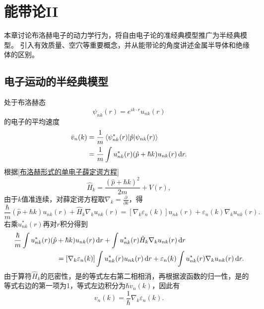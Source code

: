 \chapter{能带论II}
    本章讨论布洛赫电子的动力学行为，将自由电子论的准经典模型推广为半经典模型。
    引入有效质量、空穴等重要概念，并从能带论的角度讲述金属半导体和绝缘体的区别。

    \section{电子运动的半经典模型}
        处于布洛赫态
        \begin{equation}
            \psi_{nk}(r)=e^{ik\cdot r}u_{nk}(r)
        \end{equation}
        的电子的平均速度
        \begin{equation}
            \begin{split}
            \bar{v}_n(k)&=\frac{1}{m}\mathinner{\langle{\psi_{nk}^*(r)|\hat{p}|\psi_{nk}(r) }\rangle}\\
                &=\frac{1}{m}\int u_{nk}^*(r)(\hat{p}+\hbar k)u_{nk}(r)\mathop{}\!\mathrm{d} r.
            \end{split}
        \end{equation}
        根据\autoref{布洛赫形式的单电子薛定谔方程}
        \begin{equation}
            \hat{H}_k=\frac{\left( \hat{p}+\hbar k \right)^2}{2m}+V(r),        
        \end{equation}
        由于$k$值准连续，对薛定谔方程取$\nabla_k=\frac{\partial}{\partial k}$，得
        \begin{equation}
            \frac{\hbar}{m}(\hat{p}+\hbar k)u_{nk}(r)+\hat{H}_k\nabla_k u_{nk}(r)=\left[ \nabla_k \varepsilon_n(k)\right]u_{nk}(r)+\varepsilon_n(k)\nabla_ku_{nk}(r).
        \end{equation}
        右乘$u^*_{nk}(r)$再对$r$积分得到
        \begin{equation}
            \begin{split}
            \frac{\hbar}{m}\int u^*_{nk}(r)(\hat{p}&+\hbar k)u_{nk}(r)\mathop{}\!\mathrm{d} r+\int u^*_{nk}(r)\hat{H}_k\nabla_k u_{nk}(r)\mathop{}\!\mathrm{d} r\\
            &=\left[ \nabla_k \varepsilon_n(k)\right]\int u^*_{nk}(r)u_{nk}(r)\mathop{}\!\mathrm{d} r+\varepsilon_n(k)\int u^*_{nk}(r)\nabla_k u_{nk}(r)\mathop{}\!\mathrm{d} r.
            \end{split}
        \end{equation}
        由于算符$\hat{H}_k$的厄密性，是的等式左右第二相相消，再根据波函数的归一性，是的等式右边的第一项为1，等式左边积分为$\hbar v_n(k)$，因此有
        \begin{equation}
            v_n(k)=\frac{1}{\hbar}\nabla_k\varepsilon_n(k)\label{布洛赫态电子的平均速度}.
        \end{equation}


